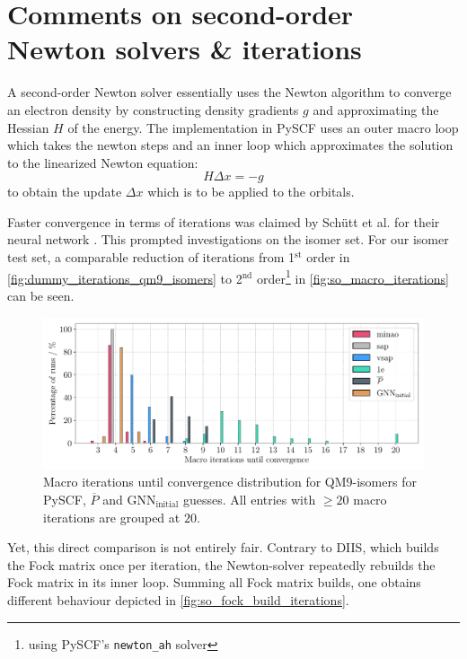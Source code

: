 \section{Comments on second-order Newton solvers \& iterations}
\label{sec:notes_on_so_newton}
A second-order Newton solver essentially uses the Newton algorithm to converge an electron density by constructing density gradients $g$ and approximating the Hessian $H$ of the energy. The implementation in PySCF uses an outer macro loop which takes the newton steps and an inner loop which approximates the solution to the linearized Newton equation:
\[H \Delta x = -g\]
to obtain the update $\Delta x$ which is to be applied to the orbitals.

Faster convergence in terms of iterations was claimed by Schütt et al. for their neural network \parencite{ref:schuett_unifying_2019}. This prompted investigations on the  isomer set. For our isomer test set, a comparable reduction of iterations from 1$^\text{st}$ order in \autoref{fig:dummy_iterations_qm9_isomers} to 2$^\text{nd}$ order\footnote{using PySCF's \texttt{newton\_ah} solver} in \autoref{fig:so_macro_iterations} can be seen. 
\begin{figure}[H]
    \centering
    \includegraphics[width=\textwidth]{../fig/gnn/SO_0D_GNN_model_iteration_count_bar.pdf}
    \caption[Macro iterations until convergence distribution for QM9-isomers]{Macro iterations until convergence distribution for QM9-isomers for PySCF, $\overline{P}$ and GNN$_\text{initial}$ guesses. All entries with $\geq 20$ macro iterations are grouped at $20$.}
    \label{fig:so_macro_iterations}
\end{figure}
Yet, this direct comparison is not entirely fair. Contrary to DIIS, which builds the Fock matrix once per iteration, the Newton-solver repeatedly rebuilds the Fock matrix in its inner loop. Summing all Fock matrix builds, one obtains different behaviour depicted in \autoref{fig:so_fock_build_iterations}.  
